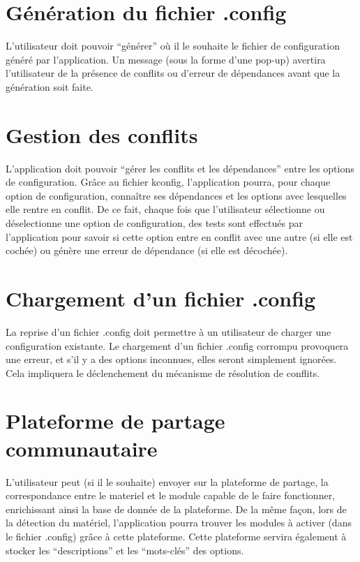 \documentclass[16pts]{report}
\begin{document}
\section{Génération du fichier .config}
\label{sec:Génération du fichier .config}

L’utilisateur doit pouvoir “générer” où il le souhaite le fichier de
configuration généré par l’application. Un message (sous la forme d’une pop-up)
avertira l’utilisateur de la présence de conflits ou d’erreur de dépendances
avant que la génération soit faite.

\section{Gestion des conflits}
\label{sec:Gestion des conflits}

L’application doit pouvoir “gérer les conflits et les dépendances” entre les
options de configuration. Grâce au fichier kconfig, l’application pourra, pour
chaque option de configuration, connaître ses dépendances et les options avec
lesquelles elle rentre en conflit. De ce fait, chaque fois que l’utilisateur
sélectionne ou déselectionne une option de configuration, des tests sont
effectués par l'application pour savoir si cette option entre en conflit avec
une autre (si elle est cochée) ou génère une erreur de dépendance (si elle est
décochée).

\section{Chargement d'un fichier .config}
\label{sec:Chargement d'un fichier .config}

La reprise d’un fichier .config doit permettre à un utilisateur de charger une
configuration existante. Le chargement d’un fichier .config corrompu provoquera
une erreur, et s’il y a des options inconnues, elles seront simplement
ignorées. Cela impliquera le déclenchement du mécanisme de résolution de
conflits.

\section{Plateforme de partage communautaire}
\label{sec:Plateforme de partage communautaire}

L’utilisateur peut (si il le souhaite) envoyer sur la plateforme de partage, la
correspondance entre le materiel et le module capable de le faire fonctionner,
enrichissant ainsi la base de donnée de la plateforme.  De la même façon, lors
de la détection du matériel, l’application pourra trouver les modules à activer
(dans le fichier .config) grâce à cette plateforme. Cette plateforme servira
également à stocker les “descriptions” et les “mots-clés” des options.
\end{document}
